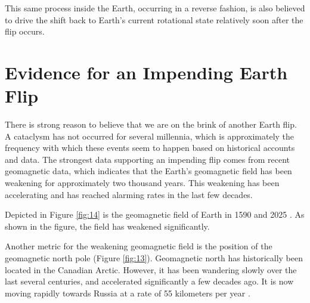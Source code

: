 \documentclass[10pt,twocolumn,letterpaper]{article}
\begin{document}
This same process inside the Earth, occurring in a reverse fashion, is also believed to drive the shift back to Earth's current rotational state relatively soon after the flip occurs.



\section{Evidence for an Impending Earth Flip}

There is strong reason to believe that we are on the brink of another Earth flip. A cataclysm has not occurred for several millennia, which is approximately the frequency with which these events seem to happen based on historical accounts and data. The strongest data supporting an impending flip comes from recent geomagnetic data, which indicates that the Earth's geomagnetic field has been weakening for approximately two thousand years. This weakening has been accelerating and has reached alarming rates in the last few decades.

Depicted in Figure \ref{fig:14} is the geomagnetic field of Earth in 1590 and 2025 \cite{125,126}. As shown in the figure, the field has weakened significantly.

Another metric for the weakening geomagnetic field is the position of the geomagnetic north pole (Figure \ref{fig:13}). Geomagnetic north has historically been located in the Canadian Arctic. However, it has been wandering slowly over the last several centuries, and accelerated significantly a few decades ago. It is now moving rapidly towards Russia at a rate of 55 kilometers per year \cite{124}.
\end{document}
